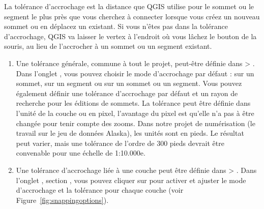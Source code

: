 \begin{itemize}
La tolérance d'accrochage est la distance que QGIS utilise pour  le sommet ou le segment le plus près que vous cherchez à connecter lorsque vous créez un nouveau sommet ou en déplacez un existant. Si vous n'êtes pas dans la tolérance d'accrochage, QGIS va laisser le vertex à l'endroit où vous lâchez le bouton de la souris, au lieu de l'accrocher à un sommet ou un segment existant.

\begin{enumerate}
\item Une tolérance générale, commune à tout le projet, peut-être définie dans  > . Dans l'onglet , vous pouvez choisir le mode d'accrochage par défaut : sur un sommet, sur un segment ou sur un sommet ou un segment. Vous pouvez également définir une tolérance d'accrochage par défaut et un rayon de recherche pour les éditions de sommets. La tolérance peut être définie dans l'unité de la couche ou en pixel, l'avantage du pixel est qu'elle n'a pas à être changée pour tenir compte des zooms. Dans notre projet de numérisation (le travail sur le jeu de données Alaska), les unités sont en pieds. Le résultat peut varier, mais une tolérance de l'ordre de 300 pieds devrait être convenable pour une échelle de 1:10.000e.
\item Une tolérance d'accrochage liée à une couche peut être définie dans  > . Dans l'onglet , section , vous pouvez cliquer sur  pour activer et ajuster le mode d'accrochage et la tolérance pour chaque couche  (voir Figure~\ref{fig:snappingoptions}).
\end{enumerate}


\end{itemize}
